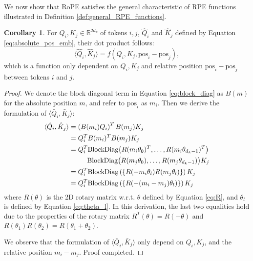 \documentclass[lettersize,journal]{IEEEtran}
\theoremstyle{definition}
\newtheorem{corollary}{Corollary}
\begin{document}
We now show that RoPE satisfies the general characteristic of RPE functions illustrated in Definition \ref{def:general_RPE_functions}.

\begin{corollary}
For $Q_i,K_j\in \mathbb{R}^{2d_k}$ of tokens $i,j$, $\hat{Q}_i$ and $\hat{K}_j$ defined by Equation \eqref{eq:absolute_pos_emb}, their dot product follows:
\begin{equation}
    \langle\hat{Q}_i, \hat{K}_j\rangle = f(Q_i,K_j,\text{pos}_i-\text{pos}_j),
\end{equation}
which is a function only dependent on $Q_i,K_j$ and relative position $\text{pos}_i-\text{pos}_j$ between tokens $i$ and $j$.
\label{coro:RoPE_valid}
\end{corollary}
\begin{proof}
We denote the block diagonal term in Equation \eqref{eq:block_diag} as $B(m)$ for the absolute position $m$, and refer to $\text{pos}_i$ as $m_i$. Then we derive the formulation of $\langle\bar{Q}_i, \bar{K}_j\rangle$:
    \begin{equation}
    \notag
    \begin{aligned}
        \langle\hat{Q}_i, \hat{K}_j\rangle &= \left(B(m_i)Q_i\right)^TB(m_j)K_j\\
        &= Q_i^T B(m_i)^T B(m_j)  K_j \\
        &= Q_i^T  \text{BlockDiag} \big( R(m_i\theta_0)^T, \dots, R(m_i\theta_{d_k -1})^T \big)\\
        &\quad\quad\,\,\,\, \text{BlockDiag} \big( R(m_j\theta_0), \dots, R(m_j\theta_{d_k -1}) \big) K_j\\
        &= Q_i^T \text{BlockDiag}\left(\{R(-m_i\theta_l)R(m_j\theta_l)\}\right) K_j\\
        &=Q_i^T \text{BlockDiag}\left(\{R(-(m_i-m_j)\theta_l)\}\right)K_j
    \end{aligned}
\end{equation}
where $R(\theta)$ is the 2D rotary matrix w.r.t. $\theta$ defined by Equation \eqref{eq:R}, and $\theta_l$ is defined by Equation \eqref{eq:theta_l}.
In this derivation, the last two equalities hold due to the properties of the rotary matrix $R^T(\theta)=R(-\theta)$ and $R(\theta_1)R(\theta_2) = R(\theta_1+\theta_2)$.

We observe that the formulation of $\langle\bar{Q}_i, \bar{K}_j\rangle$ only depend on $Q_i,K_j$, and the relative position $m_i-m_j$. Proof completed.
\end{proof}
\end{document}
